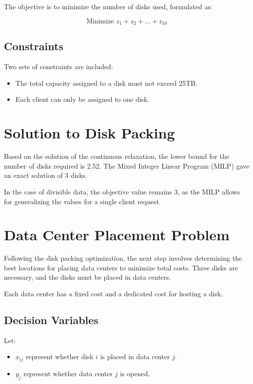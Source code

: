 \documentclass{article}
\begin{document}
The objective is to minimize the number of disks used, formulated as:

\[
    \text{Minimize } z_1 + z_2 + \dots + z_{10}
\]

\subsection{Constraints}

Two sets of constraints are included:
\begin{itemize}
    \item The total capacity assigned to a disk must not exceed 25TB.
    \item Each client can only be assigned to one disk.
\end{itemize}

\section{Solution to Disk Packing}

Based on the solution of the continuous relaxation, the lower bound for the number of disks required is 2.52. The Mixed Integer Linear Program (MILP) gave an exact solution of 3 disks.

In the case of divisible data, the objective value remains 3, as the MILP allows for generalizing the values for a single client request.

\section{Data Center Placement Problem}

Following the disk packing optimization, the next step involves determining the best locations for placing data centers to minimize total costs. Three disks are necessary, and the disks must be placed in data centers.

Each data center has a fixed cost and a dedicated cost for hosting a disk.

\subsection{Decision Variables}

Let:
\begin{itemize}
    \item $x_{ij}$ represent whether disk $i$ is placed in data center $j$.
    \item $y_j$ represent whether data center $j$ is opened.
\end{itemize}
\end{document}
